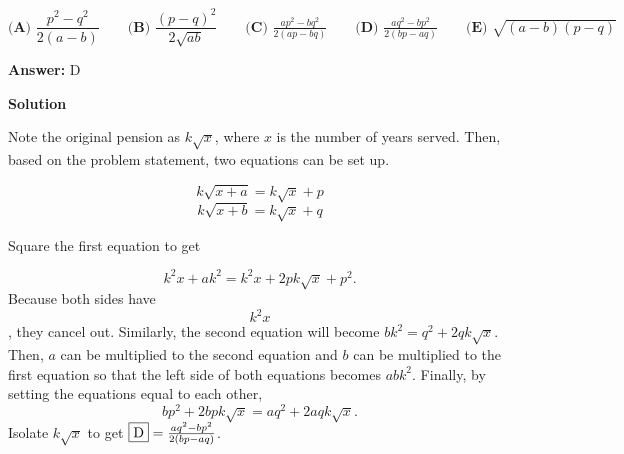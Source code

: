 \begin{enumerate}
 $\textbf{(A) }\dfrac{p^2-q^2}{2(a-b)}\qquad \textbf{(B) }\dfrac{(p-q)^2}{2\sqrt{ab}}\qquad \textbf{(C) }\frac{ap^2-bq^2}{2(ap-bq)}\qquad \textbf{(D) }\frac{aq^2-bp^2}{2(bp-aq)}\qquad \textbf{(E) }\sqrt{(a-b)(p-q)}$

 \textbf{Answer: }D



\textbf{Solution}

Note the original pension as $k\sqrt{x}$, where $x$ is the number of years served. Then, based on the problem statement, two equations can be set up. 

 
 \[k\sqrt{x+a} = k\sqrt{x} + p\]
 \[k\sqrt{x+b} = k\sqrt{x} + q\]

 Square the first equation to get

 
 \[k^2x + ak^2 = k^2x + 2pk\sqrt{x} + p^2.\]Because both sides have 
 \[k^2x\], they cancel out. Similarly, the second equation will become $bk^2 = q^2 + 2qk\sqrt{x}.$ Then, $a$ can be multiplied to the second equation and $b$ can be multiplied to the first equation so that the left side of both equations becomes $abk^2$. Finally, by setting the equations equal to each other, 
 \[bp^2 + 2bpk\sqrt{x} = aq^2 + 2aqk\sqrt{x}.\] Isolate $k\sqrt{x}$ to get $\fbox{D} = \frac{aq^2-bp^2}{2(bp-aq)}$.

 


\end{enumerate}